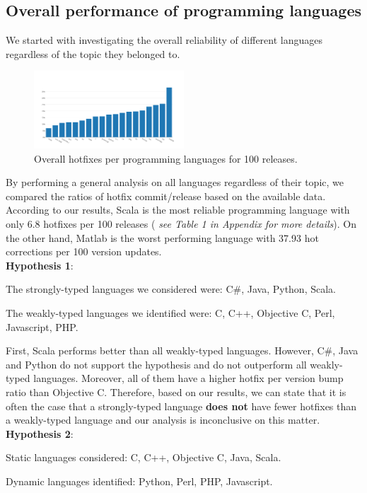 \subsection{Overall performance of programming languages}
We started with investigating the overall reliability of different languages regardless of the topic they belonged to.\\
\begin{figure}
\centering
\includegraphics[width=0.5\textwidth]{Bar_chart}
\caption{Overall hotfixes per programming languages for 100 releases.}
\label{fig:my_label}
\end{figure}

\par
By performing a general analysis on all languages regardless of their topic, we compared the ratios of hotfix commit/release based on the available data. According to our results, Scala is the most reliable programming language with only 6.8 hotfixes per 100 releases ( \textit{see Table 1 in Appendix for more details}). On the other hand, Matlab is the worst performing language with 37.93 hot corrections per 100 version updates.\\

\textbf{Hypothesis 1}:\par
The strongly-typed languages we considered were: C\#, Java, Python, Scala.\par
The weakly-typed languages we identified were: C, C++, Objective C, Perl, Javascript, PHP.\par

First, Scala performs better than all weakly-typed languages. However, C\#, Java and Python do not support the hypothesis and do not outperform all weakly-typed languages. Moreover, all of them have a higher hotfix per version bump ratio than Objective C. Therefore, based on our results, we can state that it is often the case that a strongly-typed language \textbf{does not} have fewer hotfixes than a weakly-typed language and our analysis is inconclusive on this matter.\\

\textbf{Hypothesis 2}:\par
Static languages considered: C, C++, Objective C, Java, Scala.\par
Dynamic languages identified: Python, Perl, PHP, Javascript.\par

